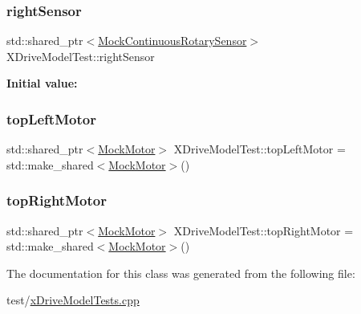 \mbox{\label{classXDriveModelTest_a4b6d557c5c88292bfee408955493af0f}} 
\subsubsection{\texorpdfstring{rightSensor}{rightSensor}}
{\footnotesize\ttfamily std\+::shared\+\_\+ptr$<$\mbox{\hyperlink{classokapi_1_1MockContinuousRotarySensor}{Mock\+Continuous\+Rotary\+Sensor}}$>$ X\+Drive\+Model\+Test\+::right\+Sensor}

{\bfseries Initial value\+:}
\begin{DoxyCode}{0}
\DoxyCodeLine{=}

\end{DoxyCode}
\mbox{\label{classXDriveModelTest_a2182fc3a274ac63052a3849e53faaea9}} 
\subsubsection{\texorpdfstring{topLeftMotor}{topLeftMotor}}
{\footnotesize\ttfamily std\+::shared\+\_\+ptr$<$\mbox{\hyperlink{classokapi_1_1MockMotor}{Mock\+Motor}}$>$ X\+Drive\+Model\+Test\+::top\+Left\+Motor = std\+::make\+\_\+shared$<$\mbox{\hyperlink{classokapi_1_1MockMotor}{Mock\+Motor}}$>$()}

\mbox{\label{classXDriveModelTest_a408390fd11ea1979cc0316ab1dcf26c2}} 
\subsubsection{\texorpdfstring{topRightMotor}{topRightMotor}}
{\footnotesize\ttfamily std\+::shared\+\_\+ptr$<$\mbox{\hyperlink{classokapi_1_1MockMotor}{Mock\+Motor}}$>$ X\+Drive\+Model\+Test\+::top\+Right\+Motor = std\+::make\+\_\+shared$<$\mbox{\hyperlink{classokapi_1_1MockMotor}{Mock\+Motor}}$>$()}



The documentation for this class was generated from the following file\+:\begin{DoxyCompactItemize}
\item 
test/\mbox{\hyperlink{xDriveModelTests_8cpp}{x\+Drive\+Model\+Tests.\+cpp}}\end{DoxyCompactItemize}
